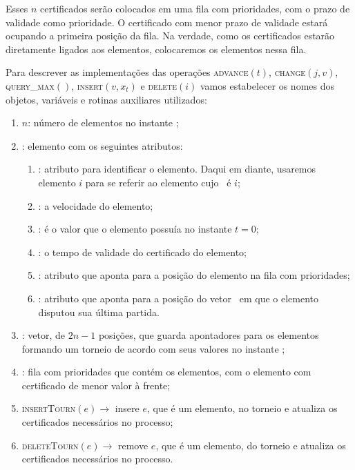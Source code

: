 Esses $n$ certificados serão colocados em uma fila com prioridades,
com o prazo de validade como prioridade. O certificado com menor
prazo de validade estará ocupando a primeira posição da fila. Na
verdade, como os certificados estarão diretamente ligados aos
elementos, colocaremos os elementos nessa fila.

Para descrever as implementações das operações
\textsc{advance}$(t)$, \textsc{change}$(j, v)$,
\textsc{query\_max}$()$, \textsc{insert}$(v, x_t)$ e
\textsc{delete}$(i)$ vamos estabelecer os nomes dos objetos,
variáveis e rotinas auxiliares utilizados:
\begin{enumerate}
    \item $n$: número de elementos no instante \now;
    \item \elemento: elemento com os seguintes atributos:
    \begin{enumerate}
        \item \id: atributo para identificar o elemento. Daqui em
        diante, usaremos elemento $i$ para se referir ao elemento
        cujo \id~é $i$;

        \item \speed: a velocidade do elemento;

        \item \initv: é o valor que o elemento possuía no
        instante $t = 0$;

        \item \cert: o tempo de validade do certificado do
        elemento;

        \item \pqpos: atributo que aponta para a posição do elemento
        na fila com prioridades;

        \item \lastmatch: atributo que aponta para a posição do
        vetor \torneio~em que o elemento disputou sua última
        partida.
    \end{enumerate}
    \item \torneio: vetor, de $2n - 1$ posições, que guarda
    apontadores para os elementos formando um torneio de acordo com
    seus valores no instante \now;

    \item \Q: fila com prioridades que contém os elementos, com o
    elemento com certificado de menor valor à frente;

    \item \textsc{insertTourn}$(e) \rightarrow$ insere $e$, que é um
    elemento, no torneio e atualiza os certificados necessários no
    processo;

    \item \textsc{deleteTourn}$(e) \rightarrow$ remove $e$, que é um
    elemento, do torneio e atualiza os certificados necessários no
    processo.
\end{enumerate}
